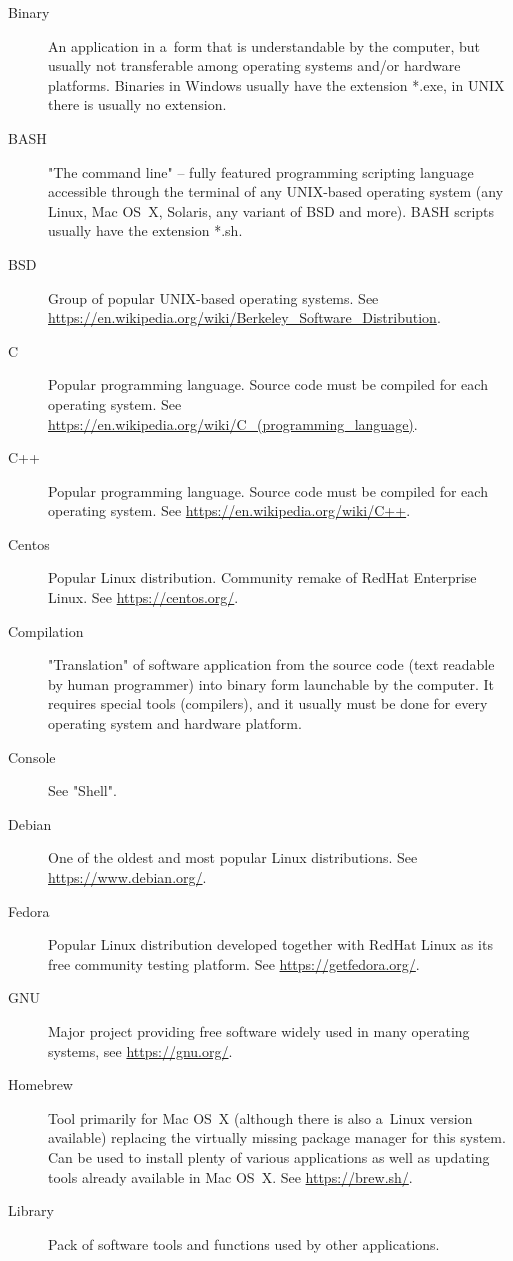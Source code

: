 \documentclass[a4paper, 11pt, twoside]{article}
\begin{document}
\begin{description}
  \item[Binary] An application in a~form that is understandable by the computer, but usually not transferable among operating systems and/or hardware platforms. Binaries in Windows usually have the extension *.exe, in UNIX there is usually no extension.
  \item[BASH] "The command line" -- fully featured programming scripting language accessible through the terminal of any UNIX-based operating system (any Linux, Mac OS~X, Solaris, any variant of BSD and more). BASH scripts usually have the extension *.sh.
  \item[BSD] Group of popular UNIX-based operating systems. See \url{https://en.wikipedia.org/wiki/Berkeley_Software_Distribution}.
  \item[C] Popular programming language. Source code must be compiled for each operating system. See \url{https://en.wikipedia.org/wiki/C_(programming_language)}.
  \item[C++] Popular programming language. Source code must be compiled for each operating system. See \url{https://en.wikipedia.org/wiki/C++}.
  \item[Centos] Popular Linux distribution. Community remake of RedHat Enterprise Linux. See \url{https://centos.org/}.
  \item[Compilation] "Translation" of software application from the source code (text readable by human programmer) into binary form launchable by the computer. It requires special tools (compilers), and it usually must be done for every operating system and hardware platform.
  \item[Console] See "Shell".
  \item[Debian] One of the oldest and most popular Linux distributions. See \url{https://www.debian.org/}.
  \item[Fedora] Popular Linux distribution developed together with RedHat Linux as its free community testing platform. See \url{https://getfedora.org/}.
  \item[GNU] Major project providing free software widely used in many operating systems, see \url{https://gnu.org/}.
  \item[Homebrew] Tool primarily for Mac OS~X (although there is also a~Linux version available) replacing the virtually missing package manager for this system. Can be used to install plenty of various applications as well as updating tools already available in Mac OS~X. See \url{https://brew.sh/}.
  \item[Library] Pack of software tools and functions used by other applications.

\end{description}
\end{document}
